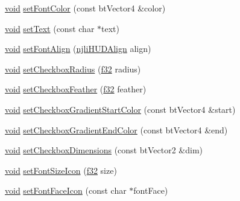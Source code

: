 \begin{DoxyCompactItemize}
\item 
\mbox{\hyperlink{_thread_8h_af1e856da2e658414cb2456cb6f7ebc66}{void}} \mbox{\hyperlink{classnjli_1_1_checkbox_h_u_d_a34ff2d255d4c683052a099f8207988ba}{set\+Font\+Color}} (const bt\+Vector4 \&color)
\item 
\mbox{\hyperlink{_thread_8h_af1e856da2e658414cb2456cb6f7ebc66}{void}} \mbox{\hyperlink{classnjli_1_1_checkbox_h_u_d_a186750a8e24a00f9473bb14c47248810}{set\+Text}} (const char $\ast$text)
\item 
\mbox{\hyperlink{_thread_8h_af1e856da2e658414cb2456cb6f7ebc66}{void}} \mbox{\hyperlink{classnjli_1_1_checkbox_h_u_d_ad910eaefd683c7809d908aa43aba1770}{set\+Font\+Align}} (\mbox{\hyperlink{namespacenjli_a376c3102aef4710f2b54a545bf0e2b3a}{njli\+H\+U\+D\+Align}} align)
\item 
\mbox{\hyperlink{_thread_8h_af1e856da2e658414cb2456cb6f7ebc66}{void}} \mbox{\hyperlink{classnjli_1_1_checkbox_h_u_d_ae3f929ce57043944b8193b5e82396fd5}{set\+Checkbox\+Radius}} (\mbox{\hyperlink{_util_8h_a5f6906312a689f27d70e9d086649d3fd}{f32}} radius)
\item 
\mbox{\hyperlink{_thread_8h_af1e856da2e658414cb2456cb6f7ebc66}{void}} \mbox{\hyperlink{classnjli_1_1_checkbox_h_u_d_a185341fbfa8e4a4f6c011f6b6a90216f}{set\+Checkbox\+Feather}} (\mbox{\hyperlink{_util_8h_a5f6906312a689f27d70e9d086649d3fd}{f32}} feather)
\item 
\mbox{\hyperlink{_thread_8h_af1e856da2e658414cb2456cb6f7ebc66}{void}} \mbox{\hyperlink{classnjli_1_1_checkbox_h_u_d_ac96f62891f59b1f56285b1aeb8dcefb0}{set\+Checkbox\+Gradient\+Start\+Color}} (const bt\+Vector4 \&start)
\item 
\mbox{\hyperlink{_thread_8h_af1e856da2e658414cb2456cb6f7ebc66}{void}} \mbox{\hyperlink{classnjli_1_1_checkbox_h_u_d_a2731b7eaefa483f90e8fe96ec4951fae}{set\+Checkbox\+Gradient\+End\+Color}} (const bt\+Vector4 \&end)
\item 
\mbox{\hyperlink{_thread_8h_af1e856da2e658414cb2456cb6f7ebc66}{void}} \mbox{\hyperlink{classnjli_1_1_checkbox_h_u_d_a57260414f1a25ced9c1da85f67641c24}{set\+Checkbox\+Dimensions}} (const bt\+Vector2 \&dim)
\item 
\mbox{\hyperlink{_thread_8h_af1e856da2e658414cb2456cb6f7ebc66}{void}} \mbox{\hyperlink{classnjli_1_1_checkbox_h_u_d_a4b88a46f30ab4675d3f9d2e14ca59a6f}{set\+Font\+Size\+Icon}} (\mbox{\hyperlink{_util_8h_a5f6906312a689f27d70e9d086649d3fd}{f32}} size)
\item 
\mbox{\hyperlink{_thread_8h_af1e856da2e658414cb2456cb6f7ebc66}{void}} \mbox{\hyperlink{classnjli_1_1_checkbox_h_u_d_a9f5a683fa1eadb2844f1d7735e01f389}{set\+Font\+Face\+Icon}} (const char $\ast$font\+Face)

\end{DoxyCompactItemize}
